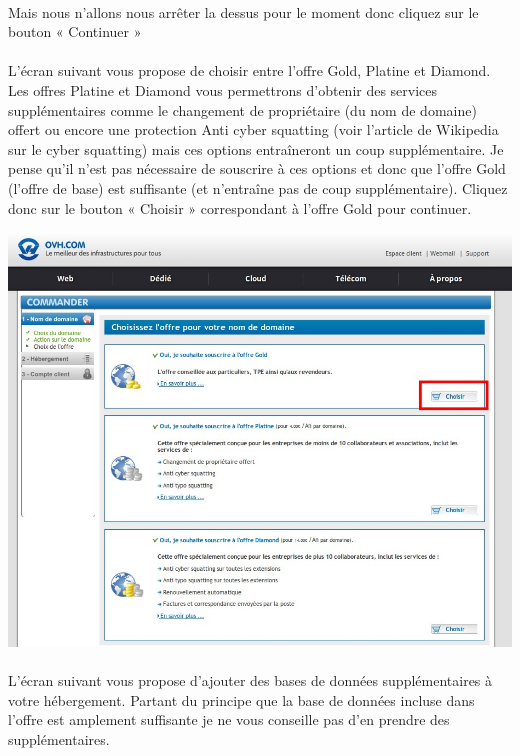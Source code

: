 \documentclass[10pt,a4paper]{article}
\begin{document}
\paragraph{}Mais nous n'allons nous arrêter la dessus pour le moment donc cliquez sur le bouton « Continuer »
\paragraph{}L'écran suivant vous propose de choisir entre l'offre Gold, Platine et Diamond. Les offres Platine et Diamond vous permettrons d'obtenir des services supplémentaires comme le changement de propriétaire (du nom de domaine) offert ou encore une protection Anti cyber squatting (voir l'article de Wikipedia sur le cyber squatting) mais ces options entraîneront un coup supplémentaire. Je pense qu'il n'est pas nécessaire de souscrire à ces options et donc que l'offre Gold (l'offre de base) est suffisante (et n'entraîne pas de coup supplémentaire). Cliquez donc sur le bouton « Choisir » correspondant à l'offre Gold pour continuer.
\begin{center}
\includegraphics[scale=0.25]{img/0276.png}
\end{center}
\paragraph{}L'écran suivant vous propose d'ajouter des bases de données supplémentaires à votre hébergement. Partant du principe que la base de données incluse dans l'offre est amplement suffisante je ne vous conseille pas d'en prendre des supplémentaires.
\end{document}
